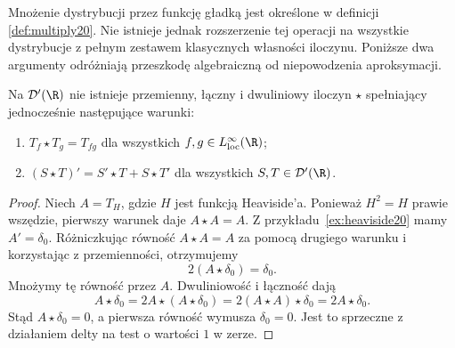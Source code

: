 Mnożenie dystrybucji przez funkcję gładką jest
określone w definicji \ref{def:multiply20}.
Nie istnieje jednak rozszerzenie tej operacji
na wszystkie dystrybucje z pełnym zestawem
klasycznych własności iloczynu. Poniższe dwa
argumenty odróżniają przeszkodę algebraiczną
od niepowodzenia aproksymacji.
\begin{stwierdzenie}
\label{prop:dt-schwartz-obstruction}
Na $\mathcal D'(\R)$ nie istnieje przemienny, łączny
i dwuliniowy iloczyn $\star$ spełniający jednocześnie
następujące warunki:
\begin{enumerate}
\item $T_f\star T_g=T_{fg}$ dla wszystkich
$f,g\in L^\infty_{\mathrm{loc}}(\R)$;
\item $(S\star T)'=S'\star T+S\star T'$ dla wszystkich
$S,T\in\mathcal D'(\R)$.
\end{enumerate}
\end{stwierdzenie}
\begin{proof}
Niech $A=T_H$, gdzie $H$ jest funkcją Heaviside'a.
Ponieważ $H^2=H$ prawie wszędzie, pierwszy warunek
daje $A\star A=A$. Z przykładu~\ref{ex:heaviside20}
mamy $A'=\delta_0$. Różniczkując równość
$A\star A=A$ za pomocą drugiego warunku i korzystając
z przemienności, otrzymujemy
\[
 2(A\star\delta_0)=\delta_0.
\]
Mnożymy tę równość przez $A$. Dwuliniowość i łączność
dają
\[
 A\star\delta_0
 =2A\star(A\star\delta_0)
 =2(A\star A)\star\delta_0
 =2A\star\delta_0.
\]
Stąd $A\star\delta_0=0$, a pierwsza równość
wymusza $\delta_0=0$. Jest to sprzeczne
z działaniem delty na test o wartości $1$ w zerze.
\end{proof}

